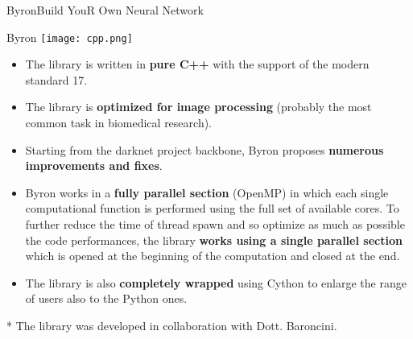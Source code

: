 \documentclass[10pt, technote, oribibl, unicode]{beamer}
\begin{document}
\begin{frame}{Byron}{Build YouR Own Neural Network}



  \begin{alertblock}{Byron \hfill\texttt{[image: cpp.png]}}
    \begin{itemize}
      \item The library is written in \textbf{pure \textsf{C++}} with the support of the modern standard 17.

      \item The library is \textbf{optimized for image processing} (probably the most common task in biomedical research).

      \item Starting from the \textsf{darknet project} backbone, \textsf{Byron} proposes \textbf{numerous improvements and fixes}.

      \item \textsf{Byron} works in a \textbf{fully parallel section} (\textsf{OpenMP}) in which each single computational function is performed using the full set of available cores. To further reduce the time of thread spawn and so optimize as much as possible the code performances, the library \textbf{works using a single parallel section} which is opened at the beginning of the computation and closed at the end.

      \item The library is also \textbf{completely wrapped} using \textsf{Cython} to enlarge the range of users also to the \textsf{Python} ones.

    \end{itemize}
  \end{alertblock}

  \vfill\scriptsize{* The library was developed in collaboration with Dott. Baroncini.}

\end{frame}
\end{document}
